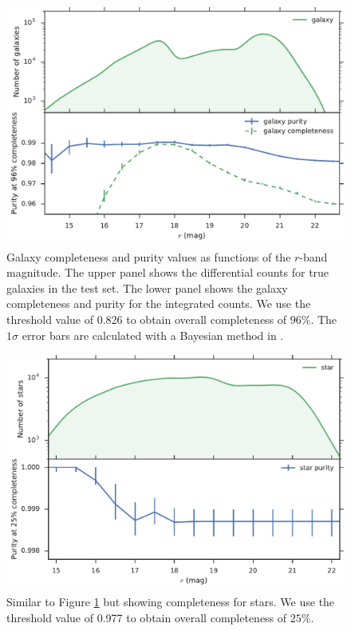 \documentclass[fleqn,usenatbib]{mnras}
\begin{document}
\begin{figure}
  \centering
  \includegraphics[width=\columnwidth]{figures/gal_comp_pur.pdf}
  \caption{
    Galaxy completeness and purity values as functions of the $r$-band magnitude.
    The upper panel shows the differential counts for true galaxies in the test set.
    The lower panel shows the galaxy completeness and purity for the integrated counts.
    We use the threshold value of 0.826 to obtain overall completeness of $96\%$.
    The $1 \sigma$ error bars are calculated with a Bayesian method in
    \citet{paterno2004calculating}.}
  \label{fig:gal_comp_pur}
\end{figure}

\begin{figure}
  \centering
  \includegraphics[width=\columnwidth]{figures/star_comp_pur.pdf}
  \caption{
    Similar to Figure \ref{fig:gal_comp_pur} but showing completeness for stars.
    We use the threshold value of 0.977 to obtain overall completeness of $25\%$.
    }
  \label{fig:star_comp_pur}
\end{figure}
\end{document}
